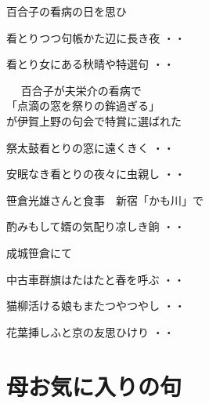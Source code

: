 \documentclass[b5paper]{tbook}[tombow]
\begin{document}
百合子の看病の日を思ひ
\begin{shiika}看とりつつ句帳かた辺に長き夜
\hfill{・・}\end{shiika}
\begin{shiika}看とり女にある秋晴や特選句
\hfill{・・}\end{shiika}
\qquad\qquad\qquad{}　
 百合子が夫栄介の看病で\\
\qquad\qquad\qquad「点滴の窓を祭りの鉾過ぎる」\\
\qquad\qquad\qquad が伊賀上野の句会で特賞に選ばれた\\
\begin{shiika}祭太鼓看とりの窓に遠くきく
\hfill{・・}\end{shiika}
\begin{shiika}安眠なき看とりの夜々に虫親し
\hfill{・・}\end{shiika}
\vspace{ 0.4cm}

笹倉光雄さんと食事　新宿「かも川」で
\begin{shiika}酌みもして婿の気配り凉しき餉
\hfill{・・}\end{shiika}
\vspace{0.4cm}


成城笹倉にて
\begin{shiika}中古車群旗はたはたと春を呼ぶ
\hfill{・・}\end{shiika}
\begin{shiika}猫柳活ける娘もまたつやつやし
\hfill{・・}\end{shiika}
\begin{shiika}花葉挿しふと京の友思ひけり
\hfill{・・}\end{shiika}
\vspace{0.4cm}

\chapter{母お気に入りの句}


%
\end{document}
